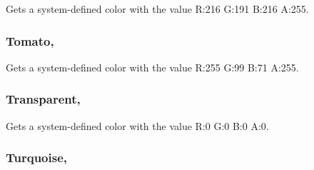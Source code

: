 Gets a system-\/defined color with the value R\+:216 G\+:191 B\+:216 A\+:255.

\hypertarget{structMicrosoft_1_1Xna_1_1Framework_1_1Color_ae54db898acfaad8489704b5c3cb9df05}{}
\subsubsection[{Tomato}]{ Tomato\hspace{0.3cm}{\ttfamily [static]}, {\ttfamily [get]}}\label{structMicrosoft_1_1Xna_1_1Framework_1_1Color_ae54db898acfaad8489704b5c3cb9df05}


Gets a system-\/defined color with the value R\+:255 G\+:99 B\+:71 A\+:255.

\hypertarget{structMicrosoft_1_1Xna_1_1Framework_1_1Color_a931d4f2dd78c6c26a3f6e02ba2cee7a0}{}
\subsubsection[{Transparent}]{ Transparent\hspace{0.3cm}{\ttfamily [static]}, {\ttfamily [get]}}\label{structMicrosoft_1_1Xna_1_1Framework_1_1Color_a931d4f2dd78c6c26a3f6e02ba2cee7a0}


Gets a system-\/defined color with the value R\+:0 G\+:0 B\+:0 A\+:0.

\hypertarget{structMicrosoft_1_1Xna_1_1Framework_1_1Color_a5e34586bde96349194d4378740ef6652}{}
\subsubsection[{Turquoise}]{ Turquoise\hspace{0.3cm}{\ttfamily [static]}, {\ttfamily [get]}}\label{structMicrosoft_1_1Xna_1_1Framework_1_1Color_a5e34586bde96349194d4378740ef6652}


